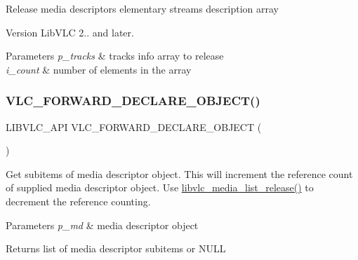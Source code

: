 Release media descriptor\textquotesingle{}s elementary streams description array

\begin{DoxyVersion}{Version}
Lib\+V\+LC 2.. and later.
\end{DoxyVersion}

\begin{DoxyParams}{Parameters}
{\em p\+\_\+tracks} & tracks info array to release \\
\hline
{\em i\+\_\+count} & number of elements in the array \\
\hline
\end{DoxyParams}
\mbox{\label{group__libvlc__media_gaacfff95cbbba67b39a47b7bdbfff1dba}} 
\subsubsection{\texorpdfstring{V\+L\+C\+\_\+\+F\+O\+R\+W\+A\+R\+D\+\_\+\+D\+E\+C\+L\+A\+R\+E\+\_\+\+O\+B\+J\+E\+C\+T()}{VLC\_FORWARD\_DECLARE\_OBJECT()}}
{\footnotesize\ttfamily L\+I\+B\+V\+L\+C\+\_\+\+A\+PI V\+L\+C\+\_\+\+F\+O\+R\+W\+A\+R\+D\+\_\+\+D\+E\+C\+L\+A\+R\+E\+\_\+\+O\+B\+J\+E\+CT (\begin{DoxyParamCaption}\item[{libvlc\+\_\+media\+\_\+list\+\_\+t $\ast$}]{ }\end{DoxyParamCaption})}

Get subitems of media descriptor object. This will increment the reference count of supplied media descriptor object. Use \hyperlink{group__libvlc__media__list_ga690973281c2f7f32cd366914a08c68dc}{libvlc\+\_\+media\+\_\+list\+\_\+release()} to decrement the reference counting.


\begin{DoxyParams}{Parameters}
{\em p\+\_\+md} & media descriptor object \\
\hline
\end{DoxyParams}
\begin{DoxyReturn}{Returns}
list of media descriptor subitems or N\+U\+LL 
\end{DoxyReturn}
